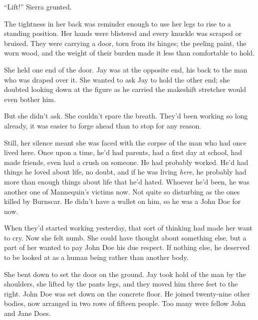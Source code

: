 





``Lift!'' Sierra grunted.



The tightness in her back was reminder enough to use her legs to rise to a standing position.  Her hands were blistered and every knuckle was scraped or bruised.  They were carrying a door, torn from its hinges; the peeling paint, the worn wood, and the weight of their burden made it less than comfortable to hold.



She held one end of the door.  Jay was at the opposite end, his back to the man who was draped over it.  She wanted to ask Jay to hold the other end; she doubted looking down at the figure as he carried the makeshift stretcher would even bother him.



But she didn't ask.  She couldn't spare the breath.  They'd been working so long already, it was easier to forge ahead than to stop for any reason.



Still, her silence meant she was faced with the corpse of the man who had once lived here.  Once upon a time, he'd had parents, had a first day at school, had made friends, even had a crush on someone.  He had probably worked.  He'd had things he loved about life, no doubt, and if he was living \emph{here}, he probably had more than enough things about life that he'd hated.  Whoever he'd been, he was another one of Mannequin's victims now.  Not quite so disturbing as the ones killed by Burnscar.  He didn't have a wallet on him, so he was a John Doe for now.



When they'd started working yesterday, that sort of thinking had made her want to cry.  Now she felt numb.  She could have thought about something else, but a part of her wanted to pay John Doe his due respect.  If nothing else, he deserved to be looked at as a human being rather than another body.



She bent down to set the door on the ground.  Jay took hold of the man by the shoulders, she lifted by the pants legs, and they moved him three feet to the right.  John Doe was set down on the concrete floor.  He joined twenty-nine other bodies, now arranged in two rows of fifteen people.  Too many were fellow John and Jane Does.



